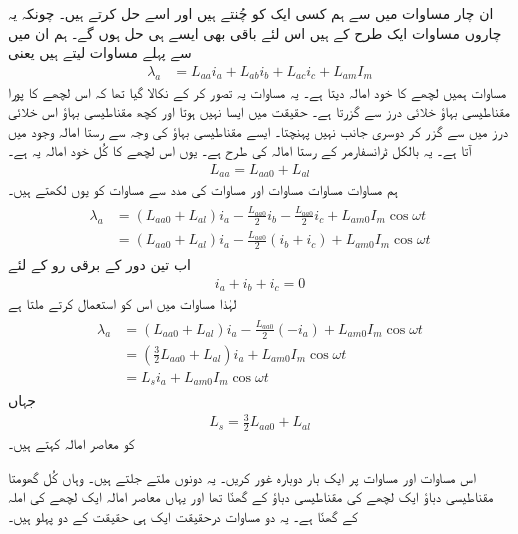 ان چار مساوات میں سے ہم کسی ایک کو چُنتے ہیں اور اسے حل کرتے ہیں۔ چونکہ یہ چاروں مساوات ایک طرح کے ہیں اس لئے باقی بھی ایسے ہی حل ہوں گے۔ ہم ان میں سے پہلے مساوات لیتے ہیں یعنی
\begin{align}
\lambda_a&=L_{aa} i_a+L_{ab} i_b +L_{ac} i_c+L_{am} I_m
\end{align}
 مساوات  ہمیں   لچھے کا خود امالہ دیتا ہے۔ یہ مساوات یہ تصور کر کے نکالا گیا تھا کہ اس لچھے کا پورا مقناطیسی بہاؤ خلائی درز سے گزرتا ہے۔ حقیقت میں ایسا نہیں ہوتا اور کچھ مقناطیسی بہاؤ اس خلائی درز میں سے گزر کر دوسری جانب نہیں پہنچتا۔ ایسے مقناطیسی بہاؤ کی وجہ سے رستا امالہ   وجود میں آتا ہے۔ یہ بالکل ٹرانسفارمر کے رستا امالہ کی طرح ہے۔ یوں اس لچھے کا کُل خود امالہ   یہ ہے۔
\begin{align}
L_{aa}=L_{aa0}+L_{al}
\end{align}
ہم مساوات  مساوات  مساوات  اور مساوات  کی مدد سے مساوات  کو یوں لکھتے ہیں۔
\begin{gather}
\begin{aligned}
\lambda_a&=\left(L_{aa0}+L_{al} \right)i_a-\frac{L_{aa0}}{2} i_b -\frac{L_{aa0}}{2} i_c+L_{am0} I_m \cos \omega t \\
&=\left(L_{aa0}+L_{al} \right)i_a-\frac{L_{aa0}}{2} \left( i_b+i_c \right)+L_{am0} I_m \cos \omega t
\end{aligned}
\end{gather}
اب تین دور کے برقی رو کے لئے 
\begin{align}
i_a+i_b+i_c=0
\end{align}
لہٰذا مساوات  میں اس کو استعمال کرتے ملتا ہے
\begin{gather}
\begin{aligned}
\lambda_a&=\left(L_{aa0}+L_{al} \right)i_a-\frac{L_{aa0}}{2} \left( -i_a \right)+L_{am0} I_m \cos \omega t\\
&=\left(\frac{3}{2} L_{aa0}+L_{al} \right)i_a+L_{am0} I_m \cos \omega t\\
&=L_s i_a+L_{am0} I_m \cos \omega t
\end{aligned}
\end{gather}
جہاں
\begin{align}
L_s=\frac{3}{2} L_{aa0}+L_{al}
\end{align}
کو معاصر امالہ کہتے ہیں۔

اس مساوات اور مساوات  پر ایک بار دوبارہ غور کریں۔ یہ دونوں ملتے جلتے ہیں۔ وہاں کُل گھومتا مقناطیسی دباؤ ایک لچھے کی مقناطیسی دباؤ کے   گھنّا تھا اور یہاں معاصر امالہ ایک لچھے کی املہ کے  گھنّا ہے۔ یہ دو مساوات درحقیقت ایک ہی حقیقت کے دو پہلو ہیں۔

